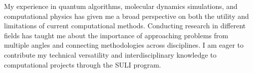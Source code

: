 \documentclass{article}
\begin{document}
My experience in quantum algorithms, molecular dynamics simulations, 
and computational physics has given me a broad perspective on both the utility and 
limitations of current computational methods. Conducting research in different fields has 
taught me about the importance of approaching problems from multiple angles and connecting 
methodologies across disciplines. I am eager to contribute my technical versatility and interdisciplinary knowledge 
to computational projects through the SULI program.
\end{document}
